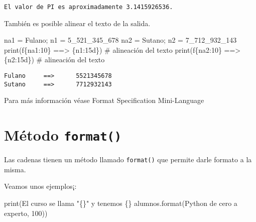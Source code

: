 \documentclass[
  letterpaper,
  DIV=11,
  numbers=noendperiod]{scrreprt}
\newenvironment{Shaded}{\begin{snugshade}}{\end{snugshade}}
\newcommand{\BuiltInTok}[1]{\textcolor[rgb]{0.00,0.23,0.31}{#1}}
\newcommand{\CommentTok}[1]{\textcolor[rgb]{0.37,0.37,0.37}{#1}}
\newcommand{\DecValTok}[1]{\textcolor[rgb]{0.68,0.00,0.00}{#1}}
\newcommand{\NormalTok}[1]{\textcolor[rgb]{0.00,0.23,0.31}{#1}}
\newcommand{\OperatorTok}[1]{\textcolor[rgb]{0.37,0.37,0.37}{#1}}
\newcommand{\SpecialCharTok}[1]{\textcolor[rgb]{0.37,0.37,0.37}{#1}}
\newcommand{\SpecialStringTok}[1]{\textcolor[rgb]{0.13,0.47,0.30}{#1}}
\newcommand{\StringTok}[1]{\textcolor[rgb]{0.13,0.47,0.30}{#1}}
\begin{document}
\begin{verbatim}
El valor de PI es aproximadamente 3.1415926536.
\end{verbatim}

También es posible alinear el texto de la salida.

\begin{Shaded}
\begin{Highlighting}[]
\NormalTok{na1 }\OperatorTok{=} \StringTok{\textquotesingle{}Fulano\textquotesingle{}}\OperatorTok{;}\NormalTok{ n1 }\OperatorTok{=} \DecValTok{5\_521\_345\_678}
\NormalTok{na2 }\OperatorTok{=} \StringTok{\textquotesingle{}Sutano\textquotesingle{}}\OperatorTok{;}\NormalTok{ n2 }\OperatorTok{=} \DecValTok{7\_712\_932\_143}
\BuiltInTok{print}\NormalTok{(}\SpecialStringTok{f\textquotesingle{}}\SpecialCharTok{\{}\NormalTok{na1}\SpecialCharTok{:10\}}\SpecialStringTok{ ==\textgreater{} }\SpecialCharTok{\{}\NormalTok{n1}\SpecialCharTok{:15d\}}\SpecialStringTok{\textquotesingle{}}\NormalTok{) }\CommentTok{\# alineación del texto}
\BuiltInTok{print}\NormalTok{(}\SpecialStringTok{f\textquotesingle{}}\SpecialCharTok{\{}\NormalTok{na2}\SpecialCharTok{:10\}}\SpecialStringTok{ ==\textgreater{} }\SpecialCharTok{\{}\NormalTok{n2}\SpecialCharTok{:15d\}}\SpecialStringTok{\textquotesingle{}}\NormalTok{) }\CommentTok{\# alineación del texto}
\end{Highlighting}
\end{Shaded}

\begin{verbatim}
Fulano     ==>      5521345678
Sutano     ==>      7712932143
\end{verbatim}

Para más información véase Format Specification Mini-Language

\section{\texorpdfstring{Método
\texttt{format()}}{Método format()}}\label{muxe9todo-format}

Las cadenas tienen un método llamado \texttt{format()} que permite darle
formato a la misma.

Veamos unos ejemplos¡:

\begin{Shaded}
\begin{Highlighting}[]
\BuiltInTok{print}\NormalTok{(}\StringTok{\textquotesingle{}El curso se llama "}\SpecialCharTok{\{\}}\StringTok{" y tenemos }\SpecialCharTok{\{\}}\StringTok{ alumnos\textquotesingle{}}\NormalTok{.}\BuiltInTok{format}\NormalTok{(}\StringTok{\textquotesingle{}Python de cero a experto\textquotesingle{}}\NormalTok{, }\DecValTok{100}\NormalTok{))}
\end{Highlighting}
\end{Shaded}
\end{document}
